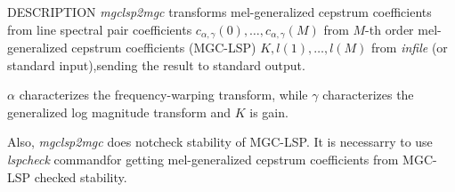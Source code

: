 \begin{synopsis}
\item [mgclsp2mgc] [ --a $A$] [ --g $G$][ --m $M$ ] [ --i $I$] [ --s
  $S$ ] [ --l] [ {\em infile} ] 

\end{synopsis}

\begin{qsection}{DESCRIPTION}
{\em mgclsp2mgc} transforms mel-generalized cepstrum coefficients from
line spectral pair coefficients $c_{\alpha,\gamma}(0), \dots,
c_{\alpha,\gamma}(M)$ from $M$-th order mel-generalized
cepstrum coefficients (MGC-LSP) $K, l(1), \dots, l(M)$ from {\em
  infile} (or standard input),sending the result to standard output. 

$\alpha$ characterizes the frequency-warping transform,
while $\gamma$ characterizes the generalized log magnitude transform
and $K$ is gain.

Also, {\em mgclsp2mgc} does notcheck stability of MGC-LSP. It is
necessarry to use {\em lspcheck} commandfor getting mel-generalized
cepstrum coefficients from MGC-LSP checked stability.

\end{qsection}

\begin{options}
\end{options}

